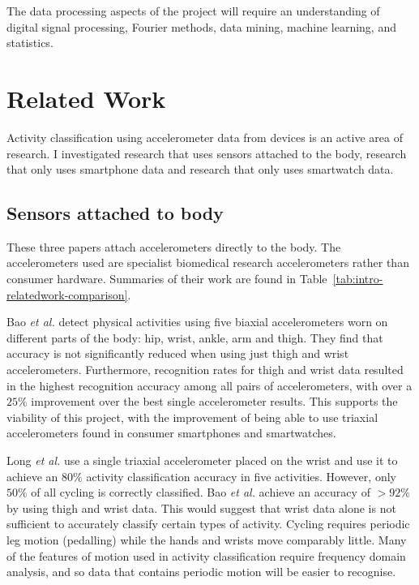     The data processing aspects of the project will require an understanding of digital signal 
    processing, Fourier methods, data mining, machine learning, and statistics.

  \section{Related Work}
  \label{sec:intro-relatedwork}
    Activity classification using accelerometer data from devices is an active area of
    research. I investigated research that uses sensors attached to the body, research that only uses smartphone data and research that only uses smartwatch data.
    
    \subsection{Sensors attached to body}
      These three papers attach accelerometers directly to the body. The accelerometers used are specialist biomedical research accelerometers rather than consumer hardware. Summaries of their work are found in Table~\ref{tab:intro-relatedwork-comparison}. 
      
      Bao \emph{et al.} \cite{bao2004activity} detect physical activities using five biaxial accelerometers
      worn on different parts of the body: hip, wrist, ankle, arm and thigh. They find that accuracy  
      is not significantly reduced when using just thigh and wrist accelerometers. Furthermore,
      recognition rates for thigh and wrist data resulted in the highest recognition accuracy among
      all pairs of accelerometers, with over a $25\%$ improvement over the best single accelerometer
      results. This supports the viability of this project, with the improvement of being able to use 
      triaxial accelerometers found in consumer smartphones and smartwatches.
    
      Long \emph{et al.} \cite{long2009single} use a single triaxial accelerometer placed on the wrist and use it to achieve an $80\%$ activity classification accuracy in five activities. However, only $50\%$ of all cycling is correctly classified. Bao \emph{et al.} achieve an accuracy of $>92\%$ by using thigh and wrist data. This would suggest that wrist data alone is not sufficient to accurately classify certain types of activity. Cycling requires periodic leg motion (pedalling) while the hands and wrists move comparably little. Many of the features of motion used in activity classification require frequency domain analysis, and so data that contains periodic motion will be easier to recognise.
    
